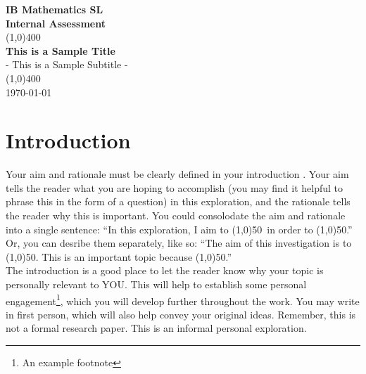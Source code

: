 \documentclass[11pt]{article}
\begin{document}
\begin{titlepage} %
	\begin{center}
	\vspace*{1cm}
	\Large{\textbf{IB Mathematics SL}}\\
	\Large{\textbf{Internal Assessment}}\\
	\vfill
	\line(1,0){400}\\
	[1mm]
	\huge{\textbf{This is a Sample Title}}\\
	[3mm]
	\Large{- This is a Sample Subtitle -}\\
	[1mm]
	\line(1,0){400}\\
	\vfill
	\today \\
	\end{center}
\end{titlepage}

\tableofcontents
\thispagestyle{empty} %
\clearpage

\setcounter{page}{1}

\section{Introduction}

Your aim and rationale must be clearly defined in your introduction \cite{DBHS1}. Your aim tells the reader what you are hoping to accomplish (you may find it helpful to phrase this in the form of a question) in this exploration, and the rationale tells the reader why this is important. You could consolodate the aim and rationale into a single sentence: ``In this exploration, I aim to \line(1,0){50}\, in order to \line(1,0){50}.'' Or, you can desribe them separately, like so: ``The aim of this investigation is to \line(1,0){50}. This is an important topic because \line(1,0){50}.'' \\

The introduction is a good place to let the reader know why your topic is personally relevant to YOU. This will help to establish some personal engagement\footnote{An example footnote}, which you will develop further throughout the work. You may write in first person, which will also help convey your original ideas. Remember, this is not a formal research paper. This is an informal personal exploration.\\
\end{document}
